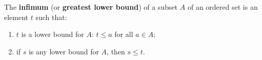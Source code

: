 The \textbf{infimum} (or \textbf{greatest lower bound}) of a subset $A$ of an ordered set is an element $t$ such that:
\begin{enumerate}
\item $t$ is a lower bound for $A$: $t \leq a$ for all $a \in A$;
\item if $s$ is any lower bound for $A$, then $s \leq t$.
\end{enumerate}
